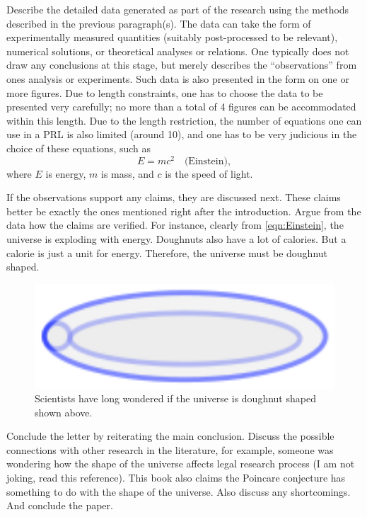 \documentclass[twocolumn,prl]{revtex4-1}
\begin{document}
Describe the detailed data generated as part of the research using the methods described in the previous paragraph(s). The data can take the form of experimentally measured quantities (suitably post-processed to be relevant), numerical solutions, or theoretical analyses or relations. One typically does not draw any conclusions at this stage, but merely describes the ``observations'' from ones analysis or experiments. Such data is also presented in the form on one or more figures. Due to length constraints, one has to choose the data to be presented very carefully; no more than a total of 4 figures can be accommodated within this length. Due to the length restriction, the number of equations one can use in a PRL is also limited (around 10), and one has to be very judicious in the choice of these equations, such as
\begin{equation}
E = m c^2 \quad \text{(Einstein)}, \label{eqn:Einstein}
\end{equation}
where $E$ is energy, $m$ is mass, and $c$ is the speed of light.

If the observations support any claims, they are discussed next. These claims better be exactly the ones mentioned right after the introduction. Argue from the data how the claims are verified. For instance, clearly from \eqref{eqn:Einstein}, the universe is exploding with energy. Doughnuts also have a lot of calories. But a calorie is just a unit for energy. Therefore, the universe must be doughnut shaped.
\begin{figure}[htb]
\includegraphics{Figures/Schematic_Doughnut}
\caption{Scientists have long wondered if the universe is doughnut shaped shown above.}
\label{fig:Schematic_Doughnut}
\end{figure}


Conclude the letter by reiterating the main conclusion. Discuss the possible connections with other research in the literature, for example, someone was wondering how the shape of the universe affects legal research process\cite{mills2003shape} (I am not joking, read this reference). This book\cite{oshea2009poincare} also claims the Poincare conjecture has something to do with the shape of the universe. Also discuss any shortcomings. And conclude the paper. 

\end{document}

